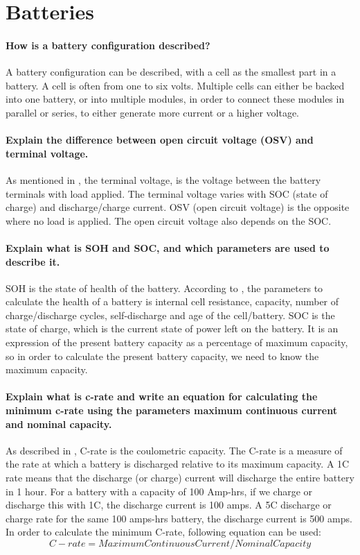 \documentclass[paper=letter, fontsize=10pt]{article}
\begin{document}
\section{Batteries}

\paragraph{How is a battery configuration described?}
A battery configuration can be described, with a cell as the smallest part in a battery. A cell is often from one to six volts. Multiple cells can either be backed into one battery, or into multiple modules, in order to connect these modules in parallel or series, to either generate more current or a higher voltage.

\paragraph{Explain the difference between open circuit voltage (OSV) and terminal voltage.}
As mentioned in \cite{understand_battery}, the terminal voltage, is the voltage between the battery terminals with load applied. The terminal voltage varies with SOC (state of charge) and discharge/charge current. OSV (open circuit voltage) is the opposite where no load is applied. The open circuit voltage also depends on the SOC.

\paragraph{Explain what is SOH and SOC, and which parameters are used to describe it.}
SOH is the state of health of the battery. According to \cite{master_thesis}, the parameters to calculate the health of a battery is internal cell resistance, capacity, number of charge/discharge cycles, self-discharge and age of the cell/battery.
SOC is the state of charge, which is the current state of power left on the battery. It is an expression of the present battery capacity as a percentage of maximum capacity, so in order to calculate the present battery capacity, we need to know the maximum capacity.

\paragraph{Explain what is c-rate and write an equation for calculating the minimum c-rate using the parameters maximum continuous current and nominal capacity.}
As described in \cite{understand_battery}, C-rate is the coulometric capacity. The C-rate is a measure of the rate at which a battery is discharged relative to its maximum capacity. A 1C rate means that the discharge (or charge) current will discharge the entire battery in 1 hour. For a battery with a capacity of 100 Amp-hrs, if we charge or discharge this with 1C, the discharge current is 100 amps. A 5C discharge or charge rate for the same 100 amps-hrs battery, the discharge current is 500 amps. In order to calculate the minimum C-rate, following equation can be used:
\[C-rate = MaximumContinuousCurrent/NominalCapacity\]
\end{document}
